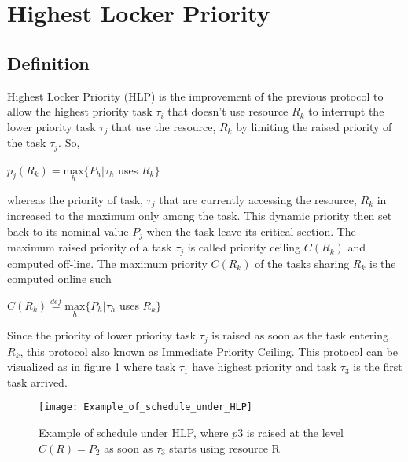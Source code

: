 \section{Highest Locker Priority}

\subsection{Definition}

Highest Locker Priority (HLP) is the improvement of the previous protocol to allow the highest priority task $\tau_{i}$ that doesn't use resource $R_{k}$ to interrupt the lower priority task $\tau_{j}$ that use the resource, $R_{k}$ by limiting the raised priority of the task $\tau_{j}$. So, 
 
\begin{center}
 $p_{j}(R_{k})=\underset{h}{\mathrm{max}} \{P_{h}| \tau_{h}$ uses $R_{k}\}  $ \cite{b5}
\end{center}

whereas the priority of task, $\tau_{j}$ that are currently accessing the resource, $R_{k}$ in increased to the maximum only among the task. This dynamic priority then set back to its nominal value $P_{j}$ when the task leave its critical section. The maximum raised priority of a task $\tau_{j}$ is called priority ceiling $ C(R_{k}) $ and computed off-line.  The maximum priority $ C(R_{k}) $ of the tasks sharing $ R_{k} $ is the computed online such

\begin{center}
$C(R_{k})\stackrel{def}{=}\underset{h}{\mathrm{max}} \{P_{h}| \tau_{h}$ uses $R_{k}\}  $ \cite{b5}
\end{center}

Since the priority of lower priority task $\tau_{j}$ is raised as soon as the task entering $ R_{k} $, this protocol also known as Immediate Priority Ceiling. This protocol can be visualized as in figure \ref{fig:Example_of_schedule_under_HLP} where task $ \tau_{1} $ have highest priority and task $ \tau_{3} $ is the first task arrived.

\begin{figure}[h]
    \centering
    \texttt{[image: Example\_of\_schedule\_under\_HLP]}
    \caption{ Example of schedule under HLP, where $ p3 $ is raised at the level $ C(R) = P_{2} $ as soon as $ \tau_{3} $ starts using resource R \cite{b5}}
    \label{fig:Example_of_schedule_under_HLP}
\end{figure}

 
